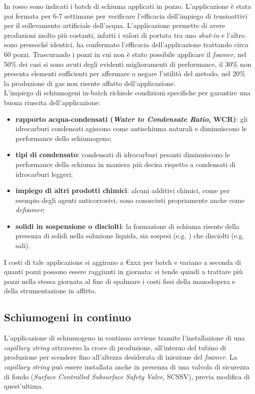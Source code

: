 In rosso sono indicati i batch di schiuma applicati in pozzo. L'applicazione è stata poi fermata per 6-7 settimane per verificare l'efficacia dell'impiego di tensioattivi per il sollevamento artificiale dell'acqua. L'applicazione permette di avere produzioni molto più costanti, infatti i valori di portata tra uno \textit{shut-in} e l'altro sono pressoché identici. \textcite{wittfeld2015foam} ha confermato l'efficacia dell'applicazione trattando circa 60 pozzi. Trascurando i pozzi in cui non è stato possibile applicare il \textit{foamer}, nel 50\% dei casi si sono avuti degli evidenti miglioramenti di performance, il 30\% non presenta elementi sufficienti per affermare o negare l'utilità del metodo, nel 20\% la produzione di gas non risente affatto dell'applicazione.\\
L'impiego di schiumogeni in-batch richiede condizioni specifiche per garantire una buona riuscita dell'applicazione:
\begin{itemize}
    \item \textbf{rapporto acqua-condensati (\textit{Water to Condensate Ratio}, WCR)}: gli idrocarburi condensati agiscono come antischiuma naturali e diminuiscono le performance dello schiumogeno;
    \item \textbf{tipi di condensato}: condensati di idrocarburi pesanti diminuiscono le performance della schiuma in maniera più decisa rispetto a condensati di idrocarburi leggeri;
    \item \textbf{impiego di altri prodotti chimici}: alcuni additivi chimici, come per esempio degli agenti anticorrosivi, sono conosciuti propriamente anche come \textit{defoamer};
    \item \textbf{solidi in sospensione o disciolti}: la formazione di schiuma risente della presenza di solidi nella soluzione liquida, sia sospesi (e.g. ) che disciolti (e.g. sali).
\end{itemize}

I costi di tale applicazione si aggirano a €xxx per batch e variano a seconda di quanti pozzi possono essere raggiunti in giornata: si tende quindi a trattare più pozzi nella stessa giornata al fine di spalmare i costi fissi della manodopera e della strumentazione in affitto.

\subsection{Schiumogeni in continuo}
L'applicazione di schiumogeno in continuo avviene tramite l'installazione di una \textit{capillary string} attraverso la croce di produzione, all'interno del tubino di produzione per scendere fino all'altezza desiderata di iniezione del \textit{foamer}. La \textit{capillary string} può essere installata anche in presenza di una valvola di sicurezza di fondo  (\textit{Surface Controlled Subsurface Safety Valve}, SCSSV), previa modifica di quest'ultima.

